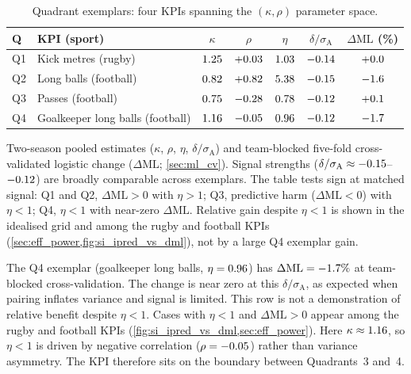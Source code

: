 \begin{table}[t]
  \centering
  \caption{Quadrant exemplars: four KPIs spanning the $(\kappa,\rho)$ parameter space.}
  \label{tab:exemplars}
  \begin{tabular}{@{}llccccc@{}}
    \toprule
    \textbf{Q} & \textbf{KPI (sport)} & $\kappa$ & $\rho$ & $\eta$ & $\delta/\sigma_{\mathrm{A}}$ & $\Delta\mathrm{ML}$ (\%) \\
    \midrule
    Q1 & Kick metres (rugby)              & $1.25$   & $+0.03$   & $1.03$   & $-0.14$   & $+0.0$ \\
    Q2 & Long balls (football)            & $0.82$   & $+0.82$   & $5.38$   & $-0.15$   & $-1.6$ \\
    Q3 & Passes (football)                & $0.75$ & $-0.28$ & $0.78$ & $-0.12$ & $+0.1$ \\
    Q4 & Goalkeeper long balls (football) & $1.16$  & $-0.05$  & $0.96$  & $-0.12$  & $-1.7$ \\
    \bottomrule
  \end{tabular}

  \medskip
  \begin{minipage}{0.95\linewidth}\small
    Two-season pooled estimates ($\kappa$, $\rho$, $\eta$, $\delta/\sigma_{\mathrm{A}}$) and team-blocked five-fold cross-validated logistic change ($\Delta\mathrm{ML}$; \cref{sec:ml_cv}). Signal strengths ($\delta/\sigma_{\mathrm{A}}\approx-0.15$--$-0.12$) are broadly comparable across exemplars. The table tests sign at matched signal: Q1 and Q2, $\Delta\mathrm{ML}>0$ with $\eta>1$; Q3, predictive harm ($\Delta\mathrm{ML}<0$) with $\eta<1$; Q4, $\eta<1$ with near-zero $\Delta\mathrm{ML}$. Relative gain despite $\eta<1$ is shown in the idealised grid and among the rugby and football KPIs (\cref{sec:eff_power,fig:si_ipred_vs_dml}), not by a large Q4 exemplar gain.
  \end{minipage}
\end{table}

The Q4 exemplar (goalkeeper long balls, $\eta=0.96$) has $\Delta\mathrm{ML}=-1.7\%$ at team-blocked cross-validation. The change is near zero at this $\delta/\sigma_{\mathrm{A}}$, as expected when pairing inflates variance and signal is limited. This row is not a demonstration of relative benefit despite $\eta<1$. Cases with $\eta<1$ and $\Delta\mathrm{ML}>0$ appear among the rugby and football KPIs (\cref{fig:si_ipred_vs_dml,sec:eff_power}). Here $\kappa\approx1.16$, so $\eta<1$ is driven by negative correlation ($\rho=-0.05$) rather than variance asymmetry. The KPI therefore sits on the boundary between Quadrants~3 and~4.

